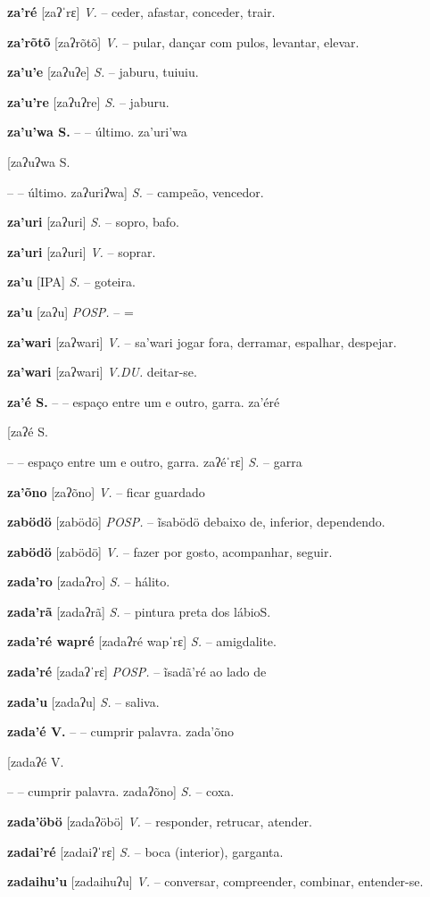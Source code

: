 {{{{{{{{{{{\textbf{za'ré} [zaʔˈrɛ] \textit{V.} -- ceder, afastar, conceder, trair.

\textbf{za'rõtõ} [zaʔrõtõ] \textit{V.} -- pular, dançar com pulos, levantar, elevar.

\textbf{za'u'e} [zaʔuʔe] \textit{S.} -- jaburu, tuiuiu.

\textbf{za'u're} [zaʔuʔre] \textit{S.} -- jaburu.

\textbf{za'u'wa S.} -- -- último. za'uri'wa} [zaʔuʔwa S.} -- -- último. zaʔuriʔwa] \textit{S.} -- campeão, vencedor.

\textbf{za'uri} [zaʔuri] \textit{S.} -- sopro, bafo.

\textbf{za'uri} [zaʔuri] \textit{V.} -- soprar.

\textbf{za'u} [IPA] \textit{S.} -- goteira.

\textbf{za'u} [zaʔu] \textit{POSP.} -- =

\textbf{za'wari} [zaʔwari] \textit{V.} -- sa'wari jogar fora, derramar, espalhar, despejar.

\textbf{za'wari} [zaʔwari] \textit{V.DU.} deitar-se.

\textbf{za'é S.} -- -- espaço entre um e outro, garra. za'éré} [zaʔé S.} -- -- espaço entre um e outro, garra. zaʔéˈrɛ] \textit{S.} -- garra

\textbf{za'õno} [zaʔõno] \textit{V.} -- ficar guardado

\textbf{zabödö} [zabödö] \textit{POSP.} -- ĩsabödö debaixo de, inferior, dependendo.

\textbf{zabödö} [zabödö] \textit{V.} -- fazer por gosto, acompanhar, seguir.

\textbf{zada'ro} [zadaʔro] \textit{S.} -- hálito.

\textbf{zada'rã} [zadaʔrã] \textit{S.} -- pintura preta dos lábioS.}

\textbf{zada'ré wapré} [zadaʔré wapˈrɛ] \textit{S.} -- amigdalite.

\textbf{zada'ré} [zadaʔˈrɛ] \textit{POSP.} -- ĩsadã'ré ao lado de

\textbf{zada'u} [zadaʔu] \textit{S.} -- saliva.

\textbf{zada'é V.} -- -- cumprir palavra. zada'õno} [zadaʔé V.} -- -- cumprir palavra. zadaʔõno] \textit{S.} -- coxa.

\textbf{zada'öbö} [zadaʔöbö] \textit{V.} -- responder, retrucar, atender.

\textbf{zadai'ré} [zadaiʔˈrɛ] \textit{S.} -- boca (interior), garganta.

\textbf{zadaihu'u} [zadaihuʔu] \textit{V.} -- conversar, compreender, combinar, entender-se.

}}}}
